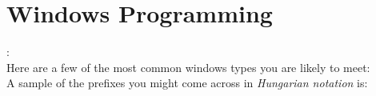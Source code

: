 \section{Windows Programming}
\begin{note}:\\
Here are a few of the most common windows types you are likely to meet:\\

\newpage
A sample of the prefixes you might come across in \textit{Hungarian notation} is:\\

\end{note}